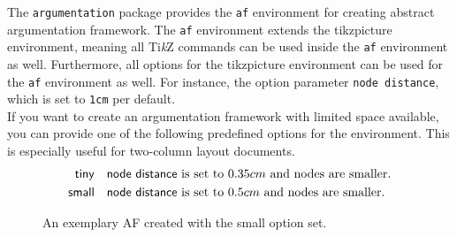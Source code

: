 \documentclass{article}
\newcommand{\tikzname}{Ti\emph{k}Z\xspace}
\newcommand{\argumentation}{\texttt{argumentation}\xspace}
\begin{document}
\begin{list}{}{\leftmargin=\parindent\rightmargin=0pt}
    \item
    The \argumentation package provides the \texttt{af} environment for creating abstract argumentation framework.
    The \texttt{af} environment extends the \textsf{tikzpicture} environment, meaning all \tikzname commands can be used inside the \texttt{af} environment as well.
    Furthermore, all options for the \textsf{tikzpicture} environment can be used for the \texttt{af} environment as well.
    For instance, the option parameter \verb|node distance|, which is set to \verb|1cm| per default.\\

    If you want to create an argumentation framework with limited space available, you can provide one of the following predefined options for the environment. This is especially useful for two-column layout documents.
    \begin{align*}
        \mathsf{tiny} &\quad \text{\textsf{node distance} is set to $0.35cm$ and nodes are smaller.}\\
        \mathsf{small} &\quad \text{\textsf{node distance} is set to $0.5cm$ and nodes are smaller.}\\
    \end{align*}
\end{list}

\begin{figure}[ht]
    \centering
    \begin{af}[small]





    \end{af}
    \caption{An exemplary AF created with the \textsf{small} option set.}
    \label{fig:example_mini}
\end{figure}
\end{document}
